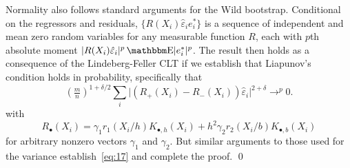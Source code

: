 \documentclass[12pt,fleqn]{article}
\begin{document}
Normality also follows standard arguments for the Wild
bootstrap. Conditional on the regressors and residuals,
$\{R(X_i) \hat\varepsilon_i e_i^* \}$ is a sequence of independent and
mean zero random variables for any measurable function $R$, each with
$p$th absolute moment
$\lvert R(X_i) \hat\varepsilon_i \rvert^p \E \lvert e_i^*
\rvert^{p}$.
The result then holds as a consequence of the Lindeberg-Feller CLT if
we establish that Liapunov's condition holds in probability, specifically that
\begin{equation}\label{eq:17}
  (\tfrac{m}{n})^{1+\delta/2} \sum_{i} \lvert (R_+(X_i) - R_-(X_i))
  \hat\varepsilon_i \rvert^{2+\delta} \to^{p} 0.
\end{equation}
with
\begin{equation*}
  R_\bullet(X_i) = \gamma_1 r_1(X_i/h) K_{\bullet,h}(X_i) + h^2 \gamma_2 r_2(X_i/b) K_{\bullet,b}(X_i)
\end{equation*}
for arbitrary nonzero vectors $\gamma_1$ and $\gamma_2$.
\citep[See, for example,][Proposition 2.27 and Theorem 23.4.]{VDV00}
But similar arguments to those used for the variance establish~\eqref{eq:17}
and complete the proof. \qed

\clearpage


\end{document}
